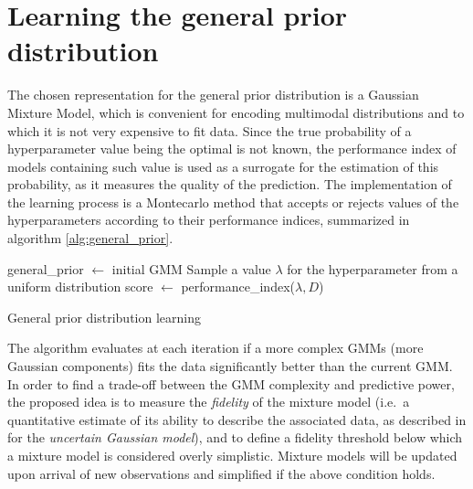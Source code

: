 	\section{Learning the general prior distribution}
	\label{sec:learning_prior}

	The chosen representation for the general prior distribution is a Gaussian Mixture Model, which
	is convenient for encoding multimodal distributions and to which it is not very expensive to fit
	data. Since the true probability of a hyperparameter value being the optimal is not known, the
	performance index of models containing such value is used as a surrogate for the estimation of
	this probability, as it measures the quality of the prediction. 
	The implementation of the learning process is a Montecarlo method that accepts or rejects
	values of the hyperparameters according to their performance indices, summarized in algorithm
	\ref{alg:general_prior}.

	\begin{algorithm}[here]
		\begin{algorithmic}
				\State general\_prior $\gets$ initial GMM
						\State Sample a value $\lambda$ for the hyperparameter from a uniform
						distribution
						\State score $\gets$ performance\_index($\lambda, D$)
							\State {}
							\State {}
						\EndIf
					\EndWhile
				\EndFor
				\State
			\EndFunction
		\end{algorithmic}
		\caption{General prior distribution learning}
		\label{alg:general_prior}
	\end{algorithm}

	The algorithm evaluates at each iteration if a more complex GMMs (more Gaussian components) fits
	the data significantly better than the current GMM.  In order to find a trade-off between the
	GMM complexity and predictive power, the proposed idea is to measure the \emph{fidelity} of the
	mixture model (i.e.~a quantitative estimate of its ability to describe the associated data, as
	described in \cite{declercq2007online, declercq2008online} for the \emph{uncertain Gaussian
	model}), and to define a fidelity threshold below which a mixture model is considered overly
	simplistic. Mixture models will be updated upon arrival of new observations and simplified if
	the above condition holds.

